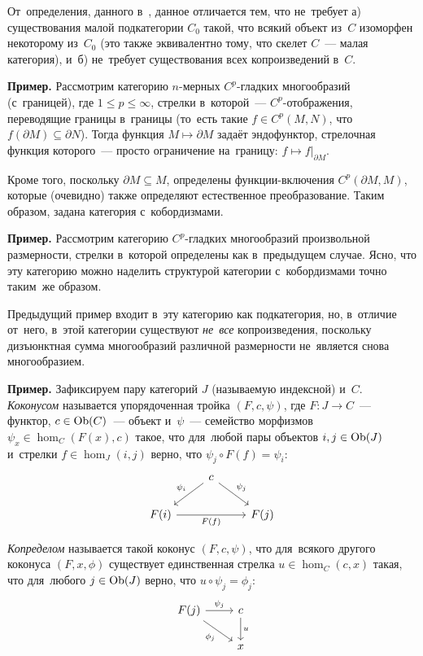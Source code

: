 \documentclass{article}
\begin{document}
От~определения, данного в~\cite{Stong68}, данное отличается тем, что не~требует а) существования малой подкатегории $C_0$
такой, что всякий объект из~$C$ изоморфен некоторому из~$C_0$ (это также эквивалентно тому, что скелет $C$~— малая категория),
и~б) не~требует существования всех копроизведений в~$C$.

\medskip
\noindent\textbf{Пример.} Рассмотрим категорию $n$-мерных $C^p$-гладких многообразий (с~границей), где $1 \leq p \leq \infty$,
стрелки в~которой~— $C^p$-отображения, переводящие границы в~границы (то~есть такие $f \in C^p(M, N)$,
что $f(\partial M) \subseteq \partial N$). Тогда функция $M \mapsto \partial M$ задаёт эндофунктор,
стрелочная функция которого~— просто ограничение на~границу: $f \mapsto f|_{\partial M}$.

Кроме того, поскольку $\partial M \subseteq M$, определены функции-включения $C^p(\partial M, M)$,
которые (очевидно) также определяют естественное преобразование. Таким образом, задана категория с~кобордизмами.
\medskip

\noindent\textbf{Пример.} Рассмотрим категорию $C^p$-гладких многообразий произвольной размерности,
стрелки в~которой определены как в~предыдущем случае. Ясно, что эту категорию можно наделить структурой
категории с~кобордизмами точно таким~же образом.

Предыдущий пример входит в~эту категорию как подкатегория, но, в~отличие от~него, в~этой категории
существуют \textit{не~все} копроизведения, поскольку дизъюнктная сумма многообразий различной размерности
не~является снова многообразием.
\medskip

\noindent\textbf{Пример.} Зафиксируем пару категорий $J$ (называемую индексной) и~$C$. \textit{Коконусом} называется упорядоченная
тройка $(F, c, \psi)$, где $F : J \rightarrow C$~— функтор, $c \in \mathrm{Ob}(C)$~— объект
и~$\psi$~— семейство морфизмов $\psi_x \in \hom_C(F(x), c)$ такое, что для~любой
пары объектов $i, j \in \mathrm{Ob}(J)$ и~стрелки $f \in \hom_J(i, j)$ верно,
что $\psi_j \circ F(f) = \psi_i$:
\[
    \begin{tikzcd}
        &                               & \arrow{ld}{}[swap]{\psi_i} c \arrow{rd}{\psi_j} &      & \\
        & F(i) \arrow{rr}{}[swap]{F(f)} &                                                 & F(j) &
    \end{tikzcd}
\]

\textit{Копределом} называется такой коконус $(F, c, \psi)$, что для~всякого другого коконуса $(F, x, \phi)$
существует единственная стрелка $u \in \hom_C(c, x)$ такая, что для~любого $j \in \mathrm{Ob}(J)$
верно, что $u \circ \psi_j = \phi_j$:
\[
    \begin{tikzcd}
        F(j) \arrow{r}{\psi_j} \arrow{dr}{}[swap]{\phi_j} & \arrow{d}{u} c \\
                                                          & x
    \end{tikzcd}
\]
\end{document}
